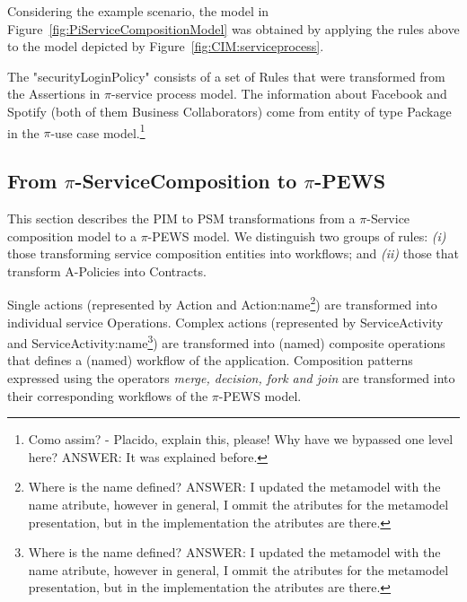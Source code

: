 \begin{example}\label{ex:toPublicMusicT5}
Considering the example scenario, the model in Figure~\ref{fig:PiServiceCompositionModel} was obtained by applying the rules above to the model depicted by Figure~\ref{fig:CIM:serviceprocess}.  

The "securityLoginPolicy" consists of a set of {\sf Rules} that were transformed from the {\sf Assertions} in $\pi$-service process model. 
The information about Facebook and Spotify (both of them {\sf Business
Collaborators}) come from entity of type {\sc Package} in the $\pi$-use case
model.\footnote{\color{red} Como assim? - Placido, explain this, please! Why
have we bypassed one level here? \color{blue} ANSWER: It was explained before.}
\end{example}

\subsection{From $\pi$-ServiceComposition to $\pi$-PEWS}

This section describes the PIM to PSM transformations from a $\pi$-Service composition model to a $\pi$-PEWS model. 
We distinguish two groups of rules: \textit{(i)} those transforming service composition entities into workflows; and \textit{(ii)} those that transform  A-Policies into Contracts.

Single actions (represented by {\sf Action} and {\sf
Action:name}\footnote{\color{red} Where is the name defined? \color{blue} ANSWER: I updated the metamodel with the name atribute, however
in general, I ommit the atributes for the metamodel presentation, but in the
implementation the atributes are there.}) are transformed into individual service {\sf Operations}.
Complex actions (represented by {\sf ServiceActivity}  and  {\sf
ServiceActivity:name}\footnote{\color{red} Where is the name defined?
\color{blue} ANSWER: I updated the metamodel with the name atribute, however
in general, I ommit the atributes for the metamodel presentation, but in the
implementation the atributes are there.}) are transformed into (named) composite
operations that defines a (named) workflow of the application.
Composition patterns expressed using the operators {\sc\em merge, decision, fork and join} are transformed into their corresponding workflows of the $\pi$-PEWS model.

